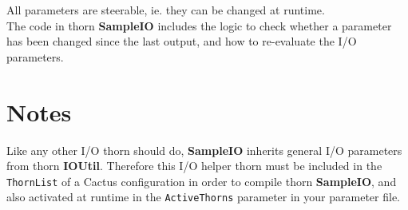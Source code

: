 \documentclass{article}
\begin{document}
All parameters are steerable, ie. they can be changed at runtime.\\
The code in thorn {\bf SampleIO} includes the logic to check whether a parameter
has been changed since the last output, and how to re-evaluate the I/O
parameters.

\section{Notes}
Like any other I/O thorn should do, {\bf SampleIO} inherits general I/O
parameters from thorn {\bf IOUtil}. Therefore this I/O helper thorn must be
included in the {\tt ThornList} of a Cactus configuration in order to compile
thorn {\bf SampleIO}, and also activated at runtime in the {\tt ActiveThorns}
parameter in your parameter file.
\end{document}
